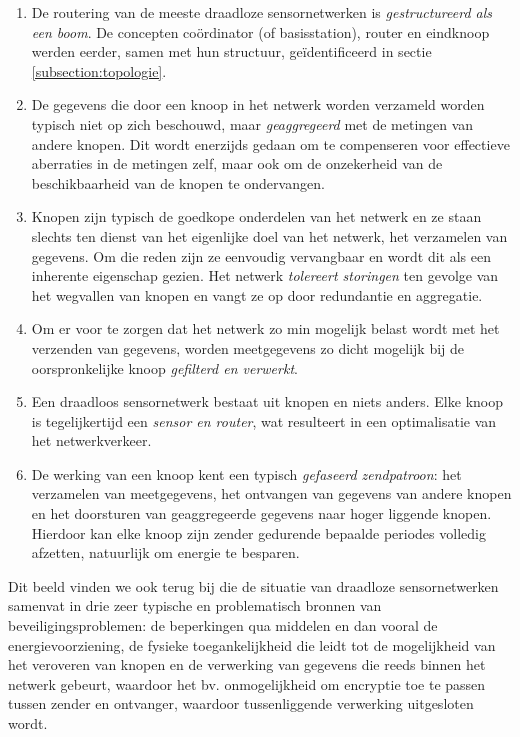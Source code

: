 \begin{enumerate}

\item{De routering van de meeste draadloze sensornetwerken is
\emph{gestructureerd als een boom}. De concepten co\"ordinator (of
basisstation), router en eindknoop werden eerder, samen met hun structuur,
ge\"identificeerd in sectie \ref{subsection:topologie}.}

\item{De gegevens die door een knoop in het netwerk worden verzameld worden
typisch niet op zich beschouwd, maar \emph{geaggregeerd} met de metingen van
andere knopen. Dit wordt enerzijds gedaan om te compenseren voor effectieve
aberraties in de metingen zelf, maar ook om de onzekerheid van de
beschikbaarheid van de knopen te ondervangen.}

\item{Knopen zijn typisch de goedkope onderdelen van het netwerk en ze staan
slechts ten dienst van het eigenlijke doel van het netwerk, het verzamelen van
gegevens. Om die reden zijn ze eenvoudig vervangbaar en wordt dit als een
inherente eigenschap gezien. Het netwerk \emph{tolereert storingen} ten gevolge
van het wegvallen van knopen en vangt ze op door redundantie en aggregatie.}

\item{Om er voor te zorgen dat het netwerk zo min mogelijk belast wordt met het
verzenden van gegevens, worden meetgegevens zo dicht mogelijk bij de
oorspronkelijke knoop \emph{gefilterd en verwerkt}.}

\item{Een draadloos sensornetwerk bestaat uit knopen en niets anders. Elke
knoop is tegelijkertijd een \emph{sensor en router}, wat resulteert in een
optimalisatie van het netwerkverkeer.}

\item{De werking van een knoop kent een typisch \emph{gefaseerd zendpatroon}:
het verzamelen van meetgegevens, het ontvangen van gegevens van andere knopen en
het doorsturen van geaggregeerde gegevens naar hoger liggende knopen. Hierdoor
kan elke knoop zijn zender gedurende bepaalde periodes volledig afzetten,
natuurlijk om energie te besparen.}

\end{enumerate}

Dit beeld vinden we ook terug bij \citep{aschenbruck2012security} die de
situatie van draadloze sensornetwerken samenvat in drie zeer typische en
problematisch bronnen van beveiligingsproblemen: de beperkingen qua middelen en
dan vooral de energievoorziening, de fysieke toegankelijkheid die leidt tot de
mogelijkheid van het veroveren van knopen en de verwerking van gegevens die
reeds binnen het netwerk gebeurt, waardoor het bv. onmogelijkheid om encryptie
toe te passen tussen zender en ontvanger, waardoor tussenliggende verwerking
uitgesloten wordt.

